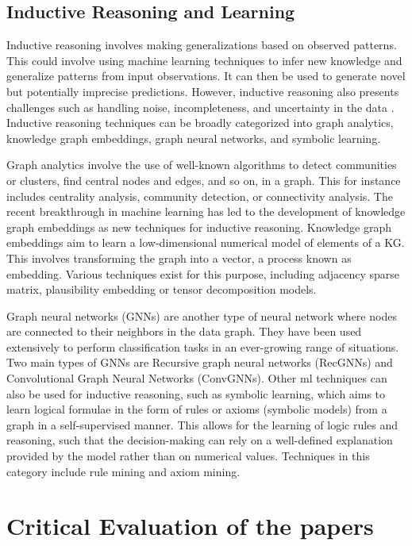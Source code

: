 \documentclass[11pt]{article} %
\begin{document}
\subsection{Inductive Reasoning and Learning}

Inductive reasoning involves making generalizations based on observed patterns. This could involve using machine learning techniques to infer new knowledge and generalize patterns from input observations. It can then be used to generate novel but potentially imprecise predictions. However, inductive reasoning also presents challenges such as handling noise, incompleteness, and uncertainty in the data \cite{KG21}. Inductive reasoning techniques can be broadly categorized into graph analytics, knowledge graph embeddings, graph neural networks, and symbolic learning.

Graph analytics involve the use of well-known algorithms to detect communities or clusters, find central nodes and edges, and so on, in a graph. This for instance includes centrality analysis, community detection, or connectivity analysis. The recent breakthrough in machine learning has led to the development of knowledge graph embeddings as new techniques for inductive reasoning. Knowledge graph embeddings aim to learn a low-dimensional numerical model of elements of a KG. This involves transforming the graph into a vector, a process known as embedding. Various techniques exist for this purpose, including adjacency sparse matrix, plausibility embedding or tensor decomposition models.

Graph neural networks (GNNs) are another type of neural network where nodes are connected to their neighbors in the data graph. They have been used extensively to perform classification tasks in an ever-growing range of situations. Two main types of GNNs are Recursive graph neural networks (RecGNNs) and Convolutional Graph Neural Networks (ConvGNNs). Other \acrshort{ml} techniques can also be used for inductive reasoning, such as symbolic learning, which aims to learn logical formulae in the form of rules or axioms (symbolic models) from a graph in a self-supervised manner. This allows for the learning of logic rules and reasoning, such that the decision-making can rely on a well-defined explanation provided by the model rather than on numerical values. Techniques in this category include rule mining and axiom mining.

\section{Critical Evaluation of the papers}
\end{document}
